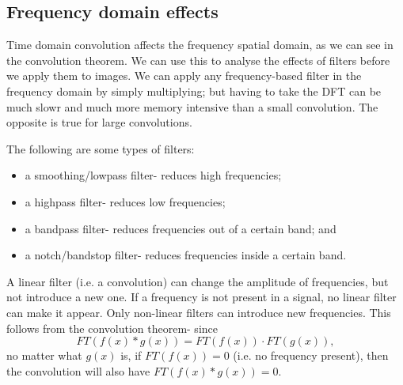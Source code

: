 \documentclass[a4paper, openany]{memoir}
\begin{document}
\subsection{Frequency domain effects}
Time domain convolution affects the frequency spatial domain, as we can see in the convolution theorem. We can use this to analyse the effects of filters before we apply them to images. We can apply any frequency-based filter in the frequency domain by simply multiplying; but having to take the DFT can be much slowr and much more memory intensive than a small convolution. The opposite is true for large convolutions.

The following are some types of filters:
\begin{itemize}
    \item a smoothing/lowpass filter- reduces high frequencies;
    \item a highpass filter- reduces low frequencies;
    \item a bandpass filter- reduces frequencies out of a certain band; and
    \item a notch/bandstop filter- reduces frequencies inside a certain band.
\end{itemize}

A linear filter (i.e. a convolution) can change the amplitude of frequencies, but not introduce a new one. If a frequency is not present in a signal, no linear filter can make it appear. Only non-linear filters can introduce new frequencies. This follows from the convolution theorem- since
\[FT(f(x) * g(x)) = FT(f(x)) \cdot FT(g(x)),\]
no matter what $g(x)$ is, if $FT(f(x)) = 0$ (i.e. no frequency present), then the convolution will also have $FT(f(x) * g(x)) = 0$.
\end{document}
